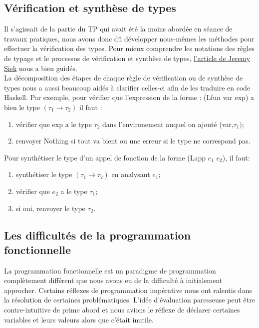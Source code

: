 \documentclass[11pt, letterpaper]{article}
\begin{document}
\subsection{Vérification et synthèse de types}

Il s'agissait de la partie du TP qui avait été la moins abordée en séance de travaux pratiques, nous avons donc dû développer nous-mêmes les méthodes pour effectuer la vérification des types. Pour mieux comprendre les notations des règles de typage et le processus de vérification et synthèse de types, \href{https://siek.blogspot.com/2012/07/crash-course-on-notation-in-programming.html}{l'article de Jeremy Siek} nous a bien guidés. \\
% 

La décomposition des étapes de chaque règle de vérification ou de synthèse de types nous a aussi beaucoup aidés à clarifier celles-ci afin de les traduire en code Haskell. Par exemple, pour vérifier que l'expression de la forme : (Lfun var exp) a bien le type $(\tau_1 \rightarrow \tau_2)$ il faut :
\begin{enumerate}
    \item vérifier que exp a le type $\tau_2$ dans l'environement auquel on ajouté (var,$\tau_1)$;
    \item  renvoyer Nothing si tout va bient ou une erreur si le type ne correspond pas.
\end{enumerate}

Pour synthétiser le type d'un appel de fonction de la forme (Lapp $e_1$ $e_2$), il faut:
\begin{enumerate}
\item synthétiser le type $(\tau_1 \rightarrow \tau_2)$ en analysant $e_1$;
\item vérifier que $e_2$ a le type $\tau_1$;
\item si oui, renvoyer le type $\tau_2$.
\end{enumerate}

\subsection{Les difficultés de la programmation fonctionnelle}
La programmation fonctionnelle est un paradigme de programmation complètement différent que nous avons eu de la difficulté à initialement approcher. Certains réflexes de programmation impérative nous ont ralentis dans la résolution de certaines problématiques. L'idée d'évaluation paresseuse peut être contre-intuitive de prime abord et nous avions le réflexe de déclarer certaines variables et leurs valeurs alors que c'était inutile.
\end{document}
